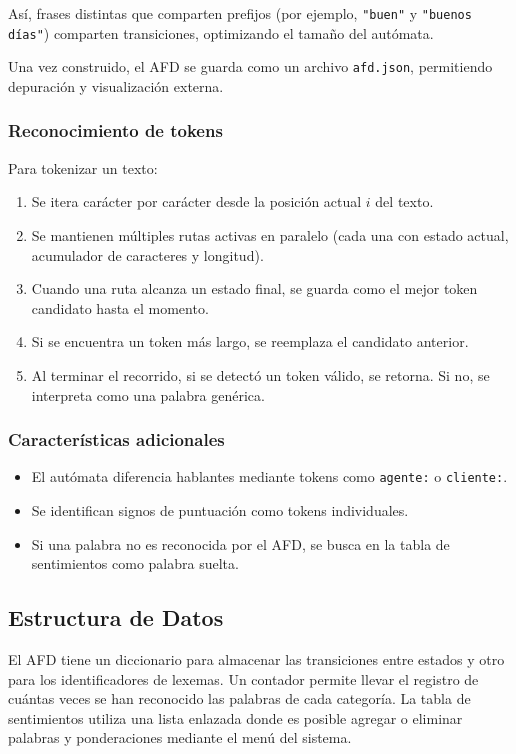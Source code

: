 Así, frases distintas que comparten prefijos (por ejemplo, \texttt{"buen"} y \texttt{"buenos
	días"}) comparten transiciones, optimizando el tamaño del autómata.

Una vez construido, el AFD se guarda como un archivo \texttt{afd.json}, permitiendo depuración
y visualización externa.

\subsubsection{Reconocimiento de tokens}

Para tokenizar un texto:
\begin{enumerate}
	\item Se itera carácter por carácter desde la posición actual $i$ del texto.
	\item Se mantienen múltiples rutas activas en paralelo (cada una con estado actual, acumulador de caracteres y longitud).
	\item Cuando una ruta alcanza un estado final, se guarda como el mejor token candidato hasta el momento.
	\item Si se encuentra un token más largo, se reemplaza el candidato anterior.
	\item Al terminar el recorrido, si se detectó un token válido, se retorna. Si no, se interpreta como una palabra genérica.
\end{enumerate}

\subsubsection{Características adicionales}

\begin{itemize}
	\item El autómata diferencia hablantes mediante tokens como \texttt{agente:} o \texttt{cliente:}.
	\item Se identifican signos de puntuación como tokens individuales.
	\item Si una palabra no es reconocida por el AFD, se busca en la tabla de sentimientos como palabra suelta.
\end{itemize}

\subsection{Estructura de Datos}
El AFD tiene un diccionario para almacenar las transiciones entre estados y otro para los
identificadores de lexemas. Un contador permite llevar el registro de cuántas veces se han
reconocido las palabras de cada categoría. La tabla de sentimientos utiliza una lista enlazada
donde es posible agregar o eliminar palabras y ponderaciones mediante el menú del sistema.


